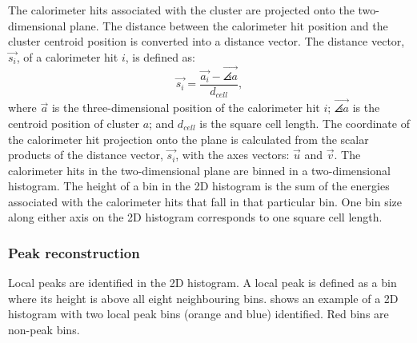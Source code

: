 




The calorimeter hits associated with the cluster are projected onto the two-dimensional plane.  The distance between the calorimeter hit position and the cluster centroid position is converted into a distance vector. The distance vector, $\vec{s_{i}}$, of a calorimeter hit $i$, is defined as:
\begin{equation}
\vec{s_{i}} = \frac{\vec{a_{i}} -  \vec{\angles{a}}}{d_{cell}},
\end{equation}
where $\vec{a}$ is the three-dimensional position of the calorimeter hit $i$;  $\vec{\angles{a}}$ is the centroid position of cluster $a$; and $d_{cell}$ is the  \ECAL square cell length. The coordinate of the calorimeter hit projection onto the plane is calculated from the scalar products of the distance vector, $\vec{s_{i}}$, with the axes vectors: $\vec{u}$ and $\vec{v}$. 
The calorimeter hits in the two-dimensional plane are binned in a two-dimensional histogram. The height of a bin in the 2D histogram is the sum of the energies associated with the calorimeter hits that fall in that particular bin. One bin size along either axis on the 2D histogram corresponds to one \ECAL square cell length.


\subsubsection{Peak reconstruction}

Local peaks are identified in the 2D histogram. A local peak is defined as a bin where its height is above all eight neighbouring bins.  shows an example of a 2D histogram with two local peak bins (orange and blue) identified. Red bins are non-peak bins.

